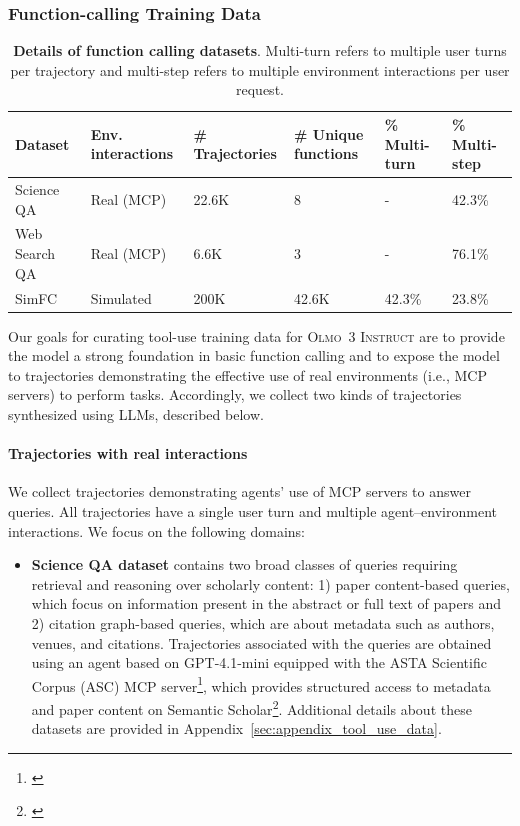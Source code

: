 \documentclass[table]{ai2style/ai2}
\newcommand{\newOlmo}{Olmo\xspace}
\newcommand{\olmothreeinstruct}{\textsc{\newOlmo~3 Instruct}\xspace}
\begin{document}
{{\subsubsection{Function-calling Training Data} \label{sec:tool-use-sft}
\begin{table}[h]
\centering
\begin{tabular}{l C{64pt} C{64pt} C{64pt} C{64pt} C{64pt}}
\toprule
{\bf Dataset} & {\bf Env. interactions} & {\bf \# Trajectories} & {\bf \# Unique functions} & {\bf \% Multi-turn} & {\bf \% Multi-step} \\ \midrule
{}
Science QA & Real (MCP) & 22.6K & 8 & - & 42.3\% \\
Web Search QA & Real (MCP) & 6.6K & 3 & - & 76.1\% \\
SimFC & Simulated & 200K & 42.6K & 42.3\% & 23.8\%
\\ \bottomrule
\end{tabular}
\caption{\textbf{Details of function calling datasets}. Multi-turn refers to multiple user turns per trajectory and multi-step refers to multiple environment interactions per user request.}
\label{tab:func_calling_datasets}
\end{table}

Our goals for curating tool-use training data for \olmothreeinstruct are to provide the model a strong foundation in basic function calling and to expose the model to trajectories demonstrating the effective use of real environments (i.e., MCP servers) to perform tasks. Accordingly, we collect two kinds of trajectories synthesized using LLMs, described below.

\paragraph{Trajectories with real interactions} We collect trajectories demonstrating agents' use of MCP servers to answer queries. All trajectories have a single user turn and multiple agent–environment interactions. We focus on the following domains: 
\begin{itemize}
    \item \textbf{Science QA dataset} contains two broad classes of queries requiring retrieval and reasoning over scholarly content: 1) paper content-based queries, which focus on information present in the abstract or full text of papers and 2) citation graph-based queries, which are about metadata such as authors, venues, and citations. Trajectories associated with the queries are obtained using an agent based on GPT-4.1-mini equipped with the ASTA Scientific Corpus (ASC) MCP server\footnote{\href{https://allenai.org/asta/resources/mcp}{}}, which provides structured access to metadata and paper content on Semantic Scholar\footnote{\href{https://www.semanticscholar.org/}{}}. Additional details about these datasets are provided in Appendix~\ref{sec:appendix_tool_use_data}.


\end{itemize}}}
\end{document}
